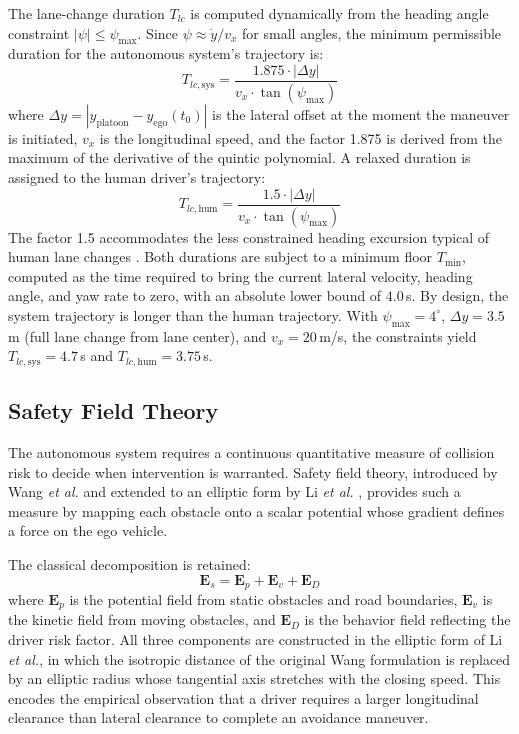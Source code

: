 \documentclass[12pt,a4paper,oneside]{report}
\begin{document}
The lane-change duration $T_{lc}$ is computed dynamically from the heading angle constraint
$|\psi| \leq \psi_{\max}$. Since $\psi \approx \dot{y}/v_x$ for small angles, the minimum
permissible duration for the autonomous system's trajectory is:
\begin{equation}
T_{lc,\text{sys}} = \frac{1.875 \cdot |\Delta y|}{v_x \cdot \tan(\psi_{\max})}
\label{eq:T_lc_min}
\end{equation}
where $\Delta y = |y_{\text{platoon}} - y_{\text{ego}}(t_0)|$ is the lateral offset at the
moment the maneuver is initiated, $v_x$ is the longitudinal speed, and the factor 1.875
is derived from the maximum of the derivative of the quintic polynomial. A relaxed duration is assigned
to the human driver's trajectory:
\begin{equation}
T_{lc,\text{hum}} = \frac{1.5 \cdot |\Delta y|}{v_x \cdot \tan(\psi_{\max})}
\label{eq:T_lc_hum}
\end{equation}
The factor 1.5 accommodates the less constrained heading excursion typical of human
lane changes \cite{toledoModelingDurationLane2007, leeComprehensiveExaminationNaturalistic2004a}.
Both durations are subject to a minimum floor $T_{\min}$, computed as the time required to
bring the current lateral velocity, heading angle, and yaw rate to zero, with an absolute
lower bound of $4.0$\,s. By design, the system trajectory is longer than the human trajectory.
With $\psi_{\max} = 4^\circ$, $\Delta y = 3.5$\,m (full lane change from lane
center), and $v_x = 20$\,m/s, the constraints yield $T_{lc,\text{sys}} = 4.7$\,s and
$T_{lc,\text{hum}} = 3.75$\,s.

\subsection{Safety Field Theory}

The autonomous system requires a continuous quantitative measure of collision risk to
decide when intervention is warranted. Safety field theory, introduced by Wang \emph{et al.}
\cite{wangDrivingSafetyField2015, wangDrivingSafetyField2016} and extended to an elliptic form by
Li \emph{et al.} \cite{liSharedControlNovel2019}, provides such a measure by mapping each obstacle onto a scalar potential whose gradient defines a force on the ego vehicle.

The classical decomposition is retained:
\begin{equation}
\mathbf{E}_s = \mathbf{E}_p + \mathbf{E}_v + \mathbf{E}_D
\label{eq:safety_field_intro}
\end{equation}
where $\mathbf{E}_p$ is the potential field from static obstacles and road
boundaries, $\mathbf{E}_v$ is the kinetic field from moving obstacles, and $\mathbf{E}_D$
is the behavior field reflecting the driver risk factor. All three components are
constructed in the elliptic form of Li \emph{et al.}, in which the isotropic distance of
the original Wang formulation is replaced by an elliptic radius whose tangential axis
stretches with the closing speed. This encodes the empirical observation that a driver
requires a larger longitudinal clearance than lateral clearance to complete an avoidance
maneuver.
\end{document}
